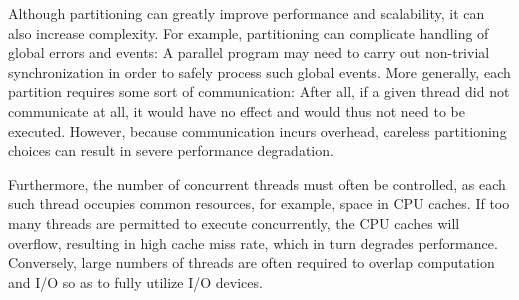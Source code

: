 Although partitioning can greatly improve performance and scalability,
it can also increase complexity.
For example, partitioning can complicate handling of global
errors and events:
A parallel program may need to carry out non-trivial synchronization
in order to safely process such global events.
More generally, each partition requires some sort of communication:
After all, if
a given thread did not communicate at all, it would have no effect and
would thus not need to be executed.
However, because communication incurs overhead, careless partitioning choices
can result in severe performance degradation.

Furthermore, the number of concurrent threads must often be controlled,
as each such thread occupies common resources, for example,
space in CPU caches.
If too many threads are permitted to execute concurrently, the
CPU caches will overflow, resulting in high cache miss rate, which in
turn degrades performance.
Conversely, large numbers of threads are often required to
overlap computation and I/O so as to fully utilize I/O devices.

\QuickQuizEnd

